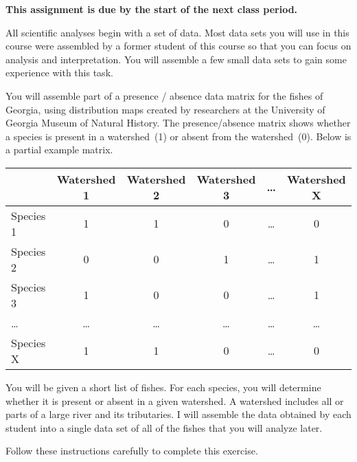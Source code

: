 \documentclass[12pt]{exam}
\begin{document}
\textbf{This assignment is due by the start of the next class period.}

All scientific analyses begin with a set of data. Most data sets 
you will use in this course were assembled by a former student
of this course so that you can focus on analysis and interpretation. You 
will assemble a few small data sets to gain some 
experience with this task.

You will assemble part of a presence / absence data matrix for 
the fishes of Georgia, using distribution maps created by 
researchers at the University of Georgia Museum of Natural 
History. The presence/absence matrix shows whether a species is 
present in a watershed~(1) or absent from the watershed~(0). 
Below is a partial example matrix.

\begin{longtable}[]{@{}lccccc@{}}
\toprule
& Watershed 1 & Watershed 2 & Watershed 3 & \ldots{} & Watershed
X\tabularnewline
\midrule
\endhead
Species 1 & 1 & 1 & 0 & \ldots{} & 0\tabularnewline
Species 2 & 0 & 0 & 1 & \ldots{} & 1\tabularnewline
Species 3 & 1 & 0 & 0 & \ldots{} & 1\tabularnewline
\ldots{} & \ldots{} & \ldots{} & \ldots{} & \ldots{} &
\ldots{}\tabularnewline
Species X & 1 & 1 & 0 & \ldots{} & 0\tabularnewline
\bottomrule
\end{longtable}

You will be given a short list of fishes. For each species, you 
will determine whether it is present or absent in a given 
watershed. A watershed includes all or parts of a large river and 
its tributaries. I will assemble the data obtained by each 
student into a single data set of all of the fishes that 
you will analyze later.

Follow these instructions carefully to complete this
exercise.
\end{document}
